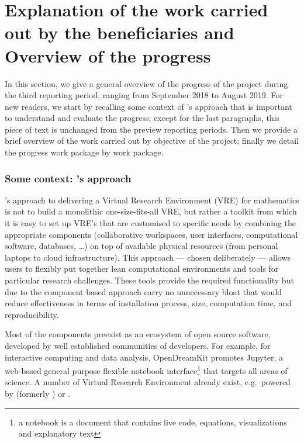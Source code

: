 \section{Explanation of the work carried out by the beneficiaries and Overview of the progress}

In this section, we give a general overview of the progress of the
project during the third reporting period, ranging from September 2018
to August 2019. For new readers, we start by recalling some context of
\ODK's approach that is important to understand and evaluate the
progress; except for the last paragraphs, this piece of text is
unchanged from the preview reporting periods. Then we provide a brief
overview of the work carried out by objective of the project; finally
we detail the progress work package by work package.

\subsubsection*{Some context: \ODK's approach}
\label{section.context}
\ODK's approach to delivering a Virtual Research Environment (VRE) for
mathematics is not to build a monolithic one-size-fits-all VRE, but
rather a toolkit from which it is easy to set up VRE's that are
customised to specific needs by combining the appropriate components
(collaborative workspaces, user interfaces, computational software,
databases, \dots) on top of available physical resources (from
personal laptops to cloud infrastructure). This approach --- chosen
deliberately --- allows users to flexibly put together lean computational
environments and tools for particular research challenges. These tools
provide the required functionality but due to the component based
approach carry no unnecessary bloat that would reduce effectiveness in
terms of installation process, size, computation time, and
reproducibility.

Most of the components preexist as an ecosystem of open source
software, developed by well established communities of developers. For
example, for interactive computing and data analysis, OpenDreamKit
promotes Jupyter, a web-based general purpose flexible notebook
interface\footnote{a notebook is a document that contains live code,
  equations, visualizations and explanatory text} that targets all
areas of science. A number of Virtual Research Environment already
exist, e.g.\ powered by \cocalc (formerly \SMC) or \JupyterHub.

